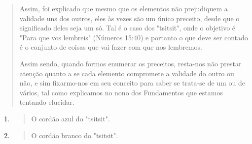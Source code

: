 \begin{quote}
Assim, foi explicado que mesmo que os elementos não prejudiquem a
validade uns dos outros, eles às vezes são um único preceito, desde que
o significado deles seja um só. Tal é o caso dos "tsitsit", onde o
objetivo é "Para que vos lembreis" (Números 15:40) e portanto o que deve
ser contado é o con­junto de coisas que vai fazer com que nos lembremos.

Assim sendo, quando formos enumerar os preceitos, resta-nos não prestar
atenção quanto a se cada elemento compromete a validade do outro ou não,
e sim fixarmo-nos em seu conceito para saber se trata-se de um ou de
vários, tal como explicamos no nono dos Fundamentos que estamos tentando
elucidar.
\end{quote}

\begin{enumerate}
\def\labelenumi{\arabic{enumi}.}
\setcounter{enumi}{20}
\item
  \begin{quote}
  O cordão azul do "tsitsit".
  \end{quote}
\item
  \begin{quote}
  O cordão branco do "tsitsit".
  \end{quote}
\end{enumerate}

